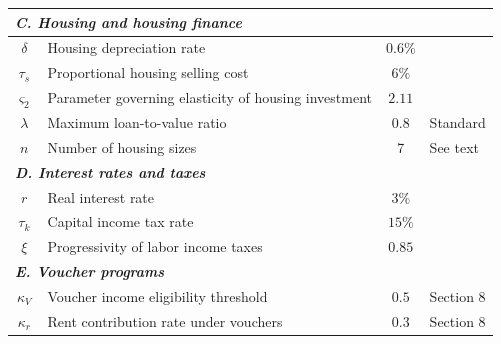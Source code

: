 \begin{table}[p]
\begin{center}
\begin{tabular}{clcl}
\midrule
\multicolumn{4}{l}{\textit{\textbf{C. Housing and housing finance}}} \\
\midrule
$\delta$ & Housing depreciation rate & $0.6\%$ & \citet{rosenthal-2014} \\
$\tau_s$ & Proportional housing selling cost & $6\%$ & \citet{gm-2003} \\
$\varsigma_{2}$ & Parameter governing elasticity of housing investment & $2.11$ & \citet{sommersullivan-2017} \\
$\lambda$ & Maximum loan-to-value ratio & $0.8$ & Standard \\
$n$ & Number of housing sizes & 7 & See text\\
\midrule
\multicolumn{4}{l}{\textit{\textbf{D. Interest rates and taxes}}} \\
\midrule
$r$ & Real interest rate & $3\%$ & \citet{kaplanetal-2019} \\
$\tau_k$ & Capital income tax rate & $15\%$ & \citet{kkk-2021} \\
$\xi$ & Progressivity of labor income taxes & $0.85$ & \citet{hsv-2020} \\

\midrule
\multicolumn{4}{l}{\textit{\textbf{E. Voucher programs}}} \\
\midrule
$\kappa_V$ & Voucher income eligibility threshold & $0.5$ & Section 8 \\
$\kappa_r$ & Rent contribution rate under vouchers & $0.3$ & Section 8 \\


\end{tabular}
\end{center}
\end{table}
